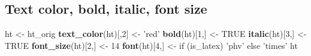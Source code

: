 \documentclass[]{article}
\newenvironment{Shaded}{\begin{snugshade}}{\end{snugshade}}
\newcommand{\KeywordTok}[1]{\textcolor[rgb]{0.13,0.29,0.53}{\textbf{{#1}}}}
\newcommand{\DecValTok}[1]{\textcolor[rgb]{0.00,0.00,0.81}{{#1}}}
\newcommand{\StringTok}[1]{\textcolor[rgb]{0.31,0.60,0.02}{{#1}}}
\newcommand{\OtherTok}[1]{\textcolor[rgb]{0.56,0.35,0.01}{{#1}}}
\newcommand{\NormalTok}[1]{{#1}}
\begin{document}
\FloatBarrier

\subsection{Text color, bold, italic, font
size}\label{text-color-bold-italic-font-size}

\begin{Shaded}
\begin{Highlighting}[]
\NormalTok{ht <-}\StringTok{ }\NormalTok{ht_orig}
\KeywordTok{text_color}\NormalTok{(ht)[,}\DecValTok{2}\NormalTok{] <-}\StringTok{ 'red'}
\KeywordTok{bold}\NormalTok{(ht)[}\DecValTok{1}\NormalTok{,] <-}\StringTok{ }\OtherTok{TRUE}
\KeywordTok{italic}\NormalTok{(ht)[}\DecValTok{3}\NormalTok{,] <-}\StringTok{ }\OtherTok{TRUE}
\KeywordTok{font_size}\NormalTok{(ht)[}\DecValTok{2}\NormalTok{,] <-}\StringTok{ }\DecValTok{14}
\KeywordTok{font}\NormalTok{(ht)[}\DecValTok{4}\NormalTok{,] <-}\StringTok{ }\NormalTok{if (is_latex) }\StringTok{'phv'} \NormalTok{else }\StringTok{'times'} 
\NormalTok{ht}
\end{Highlighting}
\end{Shaded}
\end{document}
